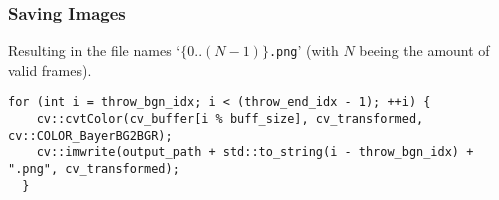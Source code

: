 \subsubsection{Saving Images}
\label{subsubsec:saving_images}

Resulting in the file names `\texttt{$\{0..(N-1)\}$.png}' (with $N$ beeing the amount of valid frames).

\begin{lstlisting}[style=C++]
  for (int i = throw_bgn_idx; i < (throw_end_idx - 1); ++i) {
    cv::cvtColor(cv_buffer[i % buff_size], cv_transformed, cv::COLOR_BayerBG2BGR);
    cv::imwrite(output_path + std::to_string(i - throw_bgn_idx) + ".png", cv_transformed);
  }
\end{lstlisting}

